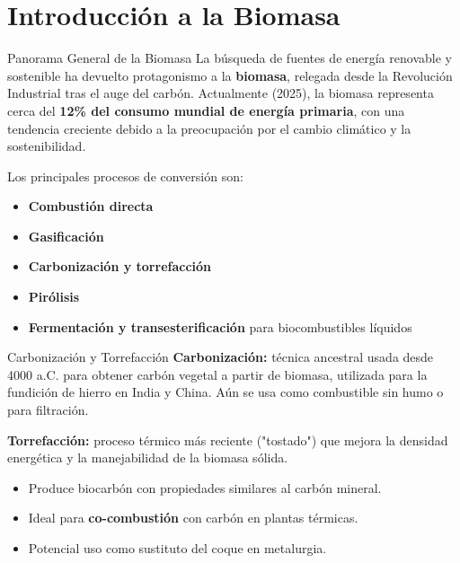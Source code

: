\documentclass[../../main.tex]{subfiles}
\begin{document}
\section{Introducción a la  Biomasa}

\begin{frame}{Panorama General de la Biomasa}
\justifying
La búsqueda de fuentes de energía renovable y sostenible ha devuelto protagonismo a la \textbf{biomasa}, relegada desde la Revolución Industrial tras el auge del carbón. Actualmente (2025), la biomasa representa cerca del \textbf{12\% del consumo mundial de energía primaria}, con una tendencia creciente debido a la preocupación por el cambio climático y la sostenibilidad.

\vspace{0.5em}
Los principales procesos de conversión son:
\begin{itemize}
  \item \textbf{Combustión directa}
  \item \textbf{Gasificación}
  \item \textbf{Carbonización y torrefacción}
  \item \textbf{Pirólisis}
  \item \textbf{Fermentación y transesterificación} para biocombustibles líquidos
\end{itemize}
\end{frame}

\begin{frame}{Carbonización y Torrefacción}
\justifying
\textbf{Carbonización:} técnica ancestral usada desde 4000 a.C. para obtener carbón vegetal a partir de biomasa, utilizada para la fundición de hierro en India y China. Aún se usa como combustible sin humo o para filtración.

\vspace{0.5em}
\textbf{Torrefacción:} proceso térmico más reciente ("tostado") que mejora la densidad energética y la manejabilidad de la biomasa sólida.
\begin{itemize}
  \item Produce biocarbón con propiedades similares al carbón mineral.
  \item Ideal para \textbf{co-combustión} con carbón en plantas térmicas.
  \item Potencial uso como sustituto del coque en metalurgia.
\end{itemize}
\end{frame}
\end{document}

